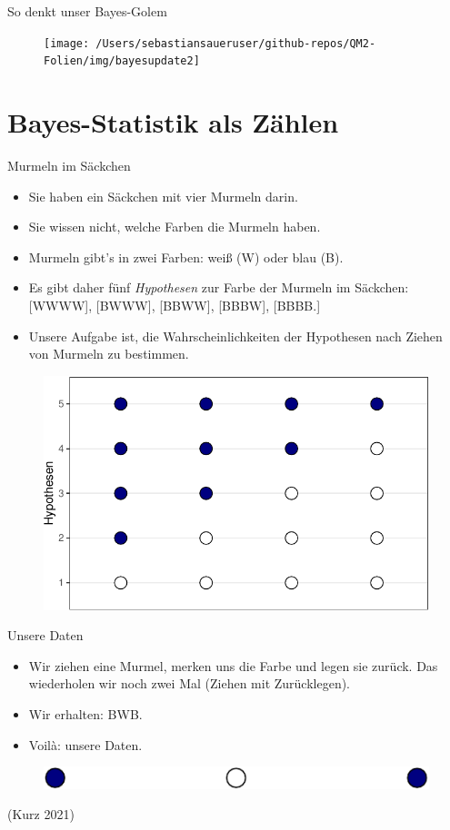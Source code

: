 \documentclass[
  ngerman,
  ignorenonframetext,
]{beamer}
\begin{document}
\begin{frame}{So denkt unser Bayes-Golem}
\protect\hypertarget{so-denkt-unser-bayes-golem}{}
\begin{figure}[H]
\texttt{[image: /Users/sebastiansaueruser/github-repos/QM2-Folien/img/bayesupdate2]} \end{figure}
\end{frame}

\hypertarget{bayes-statistik-als-zuxe4hlen}{%
\section{Bayes-Statistik als
Zählen}\label{bayes-statistik-als-zuxe4hlen}}

\begin{frame}{Murmeln im Säckchen}
\protect\hypertarget{murmeln-im-suxe4ckchen}{}
\begin{itemize}
\item
  Sie haben ein Säckchen mit vier Murmeln darin.
\item
  Sie wissen nicht, welche Farben die Murmeln haben.
\item
  Murmeln gibt's in zwei Farben: weiß (W) oder blau (B).
\item
  Es gibt daher fünf \emph{Hypothesen} zur Farbe der Murmeln im
  Säckchen: {[}WWWW{]}, {[}BWWW{]}, {[}BBWW{]}, {[}BBBW{]}, {[}BBBB.{]}
\item
  Unsere Aufgabe ist, die Wahrscheinlichkeiten der Hypothesen nach
  Ziehen von Murmeln zu bestimmen.
\end{itemize}

\begin{figure}[H]
\includegraphics[width=0.5\linewidth]{unnamed-chunk-6-1} \end{figure}
\end{frame}

\begin{frame}{Unsere Daten}
\protect\hypertarget{unsere-daten}{}
\begin{itemize}
\item
  Wir ziehen eine Murmel, merken uns die Farbe und legen sie zurück. Das
  wiederholen wir noch zwei Mal (Ziehen mit Zurücklegen).
\item
  Wir erhalten: BWB.
\item
  Voilà: unsere Daten.
\end{itemize}

\begin{figure}[H]
\includegraphics[width=0.7\linewidth]{unnamed-chunk-7-1} \end{figure}

(Kurz 2021)
\end{frame}
\end{document}
